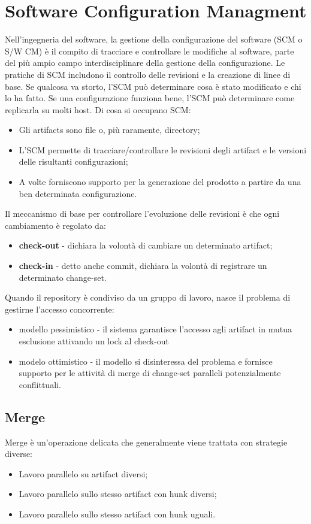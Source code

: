 \documentclass[a4paper,12pt,titlepage,oneside]{book}
\begin{document}
\chapter{Software Configuration Managment}
Nell'ingegneria del software, la gestione della configurazione del software (SCM o S/W CM) è il compito di tracciare e controllare le modifiche al software, 
parte del più ampio campo interdisciplinare della gestione della configurazione. Le pratiche di SCM includono il controllo delle revisioni e la creazione di 
linee di base. Se qualcosa va storto, l'SCM può determinare cosa è stato modificato e chi lo ha fatto. Se una configurazione funziona bene, l'SCM può 
determinare come replicarla su molti host.
Di cosa si occupano SCM:
\begin{itemize}
    \item Gli artifacts sono file o, più raramente, directory;
    \item L'SCM permette di tracciare/controllare le revisioni degli artifact e le versioni delle risultanti configurazioni;
    \item A volte forniscono supporto per la generazione del prodotto a partire da una ben determinata configurazione.
\end{itemize}

Il meccanismo di base per controllare l'evoluzione delle revisioni è che ogni cambiamento è regolato da:
\begin{itemize}
    \item \textbf{check-out} - dichiara la volontà di cambiare un determinato artifact;
    \item \textbf{check-in} - detto anche commit, dichiara la volontà di registrare un determinato change-set.
\end{itemize}

Quando il repository è condiviso da un gruppo di lavoro, nasce il problema di gestirne l'accesso concorrente:
\begin{itemize}
    \item modello pessimistico - il sistema garantisce l'accesso agli artifact in mutua esclusione attivando un lock al check-out
    \item modelo ottimistico - il modello si disinteressa del problema e fornisce supporto per le attività di merge di change-set paralleli potenzialmente conflittuali.
\end{itemize}

\section{Merge}
Merge è un'operazione delicata che generalmente viene trattata con strategie diverse:
\begin{itemize}
    \item Lavoro parallelo su artifact diversi;
    \item Lavoro parallelo sullo stesso artifact con hunk diversi;
    \item Lavoro parallelo sullo stesso artifact con hunk uguali.
\end{itemize}
\end{document}
